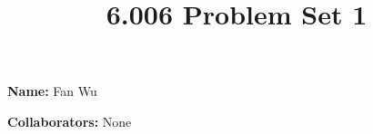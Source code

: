 \documentclass[12pt,twoside]{article}
\title{6.006 Problem Set 1}
\newcommand{\theproblemsetnum}{1}
\begin{document}

\setlength{\parindent}{0pt}
\medskip\hrulefill\medskip

{\bf Name:} Fan Wu

\medskip

{\bf Collaborators:} None

\medskip\hrulefill








\end{document}

